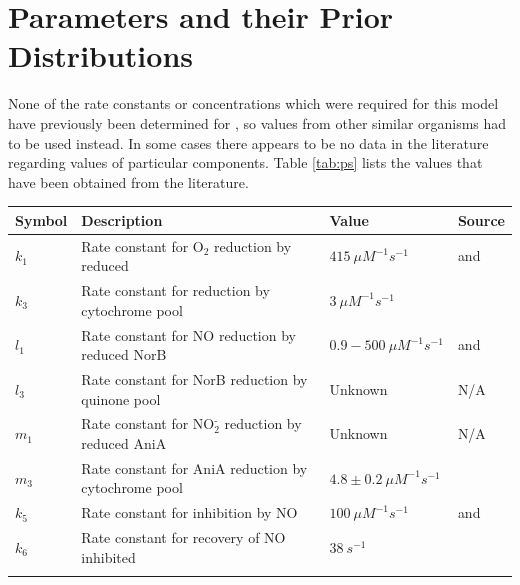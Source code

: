 \section{Parameters and their Prior Distributions}

None of the rate constants or concentrations which were required for this model have previously been determined for \Nsm, so values from other similar organisms had to be used instead. In some cases there appears to be no data in the literature regarding values of particular components. Table \ref{tab:ps} lists the values that have been obtained from the literature.

\begin{table}[tbp]
\begin{center}
\begin{tabular}{>{\centering}m{1.6cm}>{\centering}m{6.1cm}>{\centering}m{2.5cm}>{\centering}m{3.1cm}}
\toprule
\textbf{Symbol} & \textbf{Description} & \textbf{Value} & \textbf{Source}
\tabularnewline
\midrule
$k_1$ & Rate constant for O$_{\textrm{2}}$ reduction by reduced \cbbthree{} & $415~\mu M^{-1} s^{-1}$ & \citet{Forte2001} and \citet{Hunter2007}
\tabularnewline\noalign{\smallskip}\hline\noalign{\smallskip}

$k_3$ & Rate constant for \cbbthree{} reduction by cytochrome pool & $3~\mu M^{-1} s^{-1}$ & \citet{Chang2010}
\tabularnewline\noalign{\smallskip}\hline\noalign{\smallskip}

$l_1$ & Rate constant for NO reduction by reduced NorB & $0.9 - 500~\mu M^{-1} s^{-1}$ & \citet{Rock2007} and \citet{Wasser2002}
\tabularnewline\noalign{\smallskip}\hline\noalign{\smallskip}

$l_3$ & Rate constant for NorB reduction by quinone pool & Unknown & N/A
\tabularnewline\noalign{\smallskip}\hline\noalign{\smallskip}

$m_1$ & Rate constant for NO$_{\textrm{2}}^{\textrm{-}}$ reduction by reduced AniA & Unknown & N/A
\tabularnewline\noalign{\smallskip}\hline\noalign{\smallskip}

$m_3$ & Rate constant for AniA reduction by cytochrome pool & $4.8\pm0.2~\mu M^{-1}s^{-1}$ & \citet{Nojiri2009}
\tabularnewline\noalign{\smallskip}\hline\noalign{\smallskip}

$k_5$ & Rate constant for \cbbthree{} inhibition by NO & $100~\mu M ^{-1} s ^{-1}$ & \citet{Giuffre2000} and \citet{Blackmore1991}
\tabularnewline\noalign{\smallskip}\hline\noalign{\smallskip}

$k_6$ & Rate constant for recovery of NO inhibited \cbbthree{} & $38~s^{-1}$ & \citet{Rock2005}
\tabularnewline\noalign{\smallskip}\hline\noalign{\smallskip}


\end{tabular}
\end{center}
\end{table}
